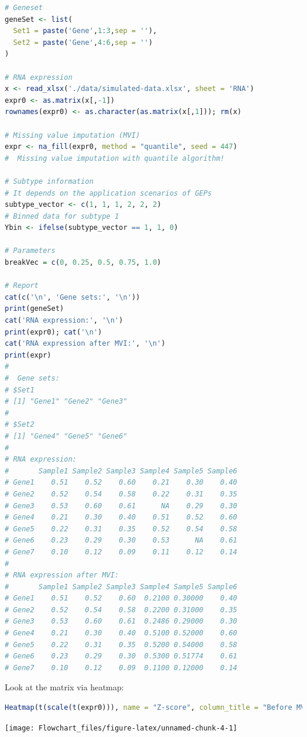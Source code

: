 \documentclass[
  12pt,
]{book}
\begin{document}
\begin{lstlisting}[language=R]
# Geneset
geneSet <- list(
  Set1 = paste('Gene',1:3,sep = ''),
  Set2 = paste('Gene',4:6,sep = '')
)

# RNA expression
x <- read_xlsx('./data/simulated-data.xlsx', sheet = 'RNA')
expr0 <- as.matrix(x[,-1])
rownames(expr0) <- as.character(as.matrix(x[,1])); rm(x)

# Missing value imputation (MVI)
expr <- na_fill(expr0, method = "quantile", seed = 447)
#  Missing value imputation with quantile algorithm!

# Subtype information
# It depends on the application scenarios of GEPs
subtype_vector <- c(1, 1, 1, 2, 2, 2)
# Binned data for subtype 1
Ybin <- ifelse(subtype_vector == 1, 1, 0)

# Parameters
breakVec = c(0, 0.25, 0.5, 0.75, 1.0)

# Report
cat(c('\n', 'Gene sets:', '\n'))
print(geneSet)
cat('RNA expression:', '\n')
print(expr0); cat('\n')
cat('RNA expression after MVI:', '\n')
print(expr)
# 
#  Gene sets: 
# $Set1
# [1] "Gene1" "Gene2" "Gene3"
# 
# $Set2
# [1] "Gene4" "Gene5" "Gene6"
# 
# RNA expression: 
#       Sample1 Sample2 Sample3 Sample4 Sample5 Sample6
# Gene1    0.51    0.52    0.60    0.21    0.30    0.40
# Gene2    0.52    0.54    0.58    0.22    0.31    0.35
# Gene3    0.53    0.60    0.61      NA    0.29    0.30
# Gene4    0.21    0.30    0.40    0.51    0.52    0.60
# Gene5    0.22    0.31    0.35    0.52    0.54    0.58
# Gene6    0.23    0.29    0.30    0.53      NA    0.61
# Gene7    0.10    0.12    0.09    0.11    0.12    0.14
# 
# RNA expression after MVI: 
#       Sample1 Sample2 Sample3 Sample4 Sample5 Sample6
# Gene1    0.51    0.52    0.60  0.2100 0.30000    0.40
# Gene2    0.52    0.54    0.58  0.2200 0.31000    0.35
# Gene3    0.53    0.60    0.61  0.2486 0.29000    0.30
# Gene4    0.21    0.30    0.40  0.5100 0.52000    0.60
# Gene5    0.22    0.31    0.35  0.5200 0.54000    0.58
# Gene6    0.23    0.29    0.30  0.5300 0.51774    0.61
# Gene7    0.10    0.12    0.09  0.1100 0.12000    0.14
\end{lstlisting}

Look at the matrix via heatmap:

\begin{lstlisting}[language=R]
Heatmap(t(scale(t(expr0))), name = "Z-score", column_title = "Before MVI")
\end{lstlisting}

\begin{center}\texttt{[image: Flowchart\_files/figure-latex/unnamed-chunk-4-1]} \end{center}
\end{document}
